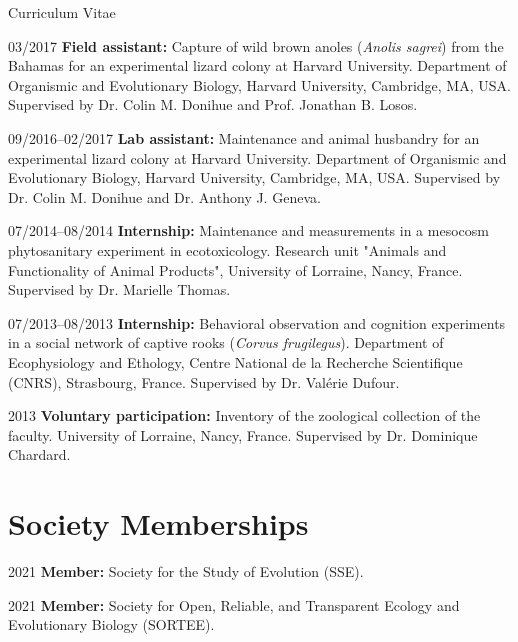 \documentclass[11pt,a4paper]{article}
\begin{document}
\begin{cv}{Curriculum Vitae}
		\begin{cvlist}{}
		
			\item[03/2017] \textbf{Field assistant:} Capture of wild brown anoles (\textit{Anolis sagrei}) from the Bahamas for an experimental lizard colony at Harvard University. Department of Organismic and Evolutionary Biology, Harvard University, Cambridge, MA, USA. Supervised by Dr. Colin M. Donihue and Prof. Jonathan B. Losos.
		
			\item[09/2016--02/2017] \textbf{Lab assistant:} Maintenance and animal husbandry for an experimental lizard colony at Harvard University. Department of Organismic and Evolutionary Biology, Harvard University, Cambridge, MA, USA. Supervised by Dr. Colin M. Donihue and Dr. Anthony J. Geneva.
		
			\item[07/2014--08/2014] \textbf{Internship:} Maintenance and measurements in a mesocosm phytosanitary experiment in ecotoxicology. Research unit "Animals and Functionality of Animal Products", University of Lorraine, Nancy, France. Supervised by Dr. Marielle Thomas.
		
			\item[07/2013--08/2013] \textbf{Internship:} Behavioral observation and cognition experiments in a social network of captive rooks (\textit{Corvus frugilegus}). Department of Ecophysiology and Ethology, Centre National de la Recherche Scientifique (CNRS), Strasbourg, France. Supervised by Dr. Valérie Dufour.
		
			\item[2013] \textbf{Voluntary participation:} Inventory of the zoological collection of the faculty. University of Lorraine, Nancy, France. Supervised by Dr. Dominique Chardard.
		
		\end{cvlist}
		
		\section{Society Memberships}
		
		\begin{cvlist}{}
			
			\item[2021] \textbf{Member:} Society for the Study of Evolution (SSE). 
			
			\item[2021] \textbf{Member:} Society for Open, Reliable, and Transparent Ecology and Evolutionary Biology (SORTEE).
			

\end{cvlist}
\end{cv}
\end{document}
